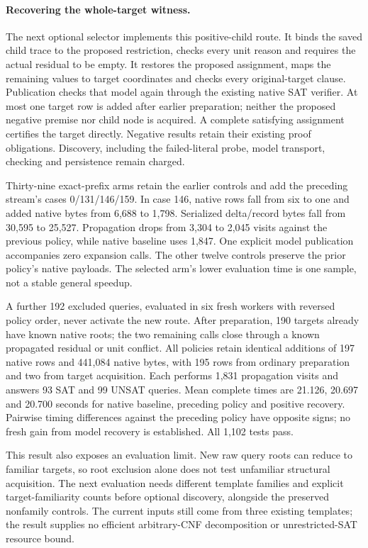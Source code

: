 \documentclass[11pt,a4paper]{article}
\numberwithin{equation}{section}
\theoremstyle{plain}
\theoremstyle{definition}
\theoremstyle{remark}
\begin{document}
\paragraph{Recovering the whole-target witness.}
The next optional selector implements this positive-child route. It binds the
saved child trace to the proposed restriction, checks every unit reason and
requires the actual residual to be empty. It restores the proposed assignment,
maps the remaining values to target coordinates and checks every original-target
clause. Publication checks that model again through the existing native SAT
verifier. At most one target row is added after earlier preparation; neither
the proposed negative premise nor child node is acquired. A complete satisfying
assignment certifies the target directly. Negative results retain their existing
proof obligations. Discovery, including the failed-literal probe, model transport,
checking and persistence remain charged.

Thirty-nine exact-prefix arms retain the earlier controls and add the preceding
stream's cases 0/131/146/159. In case 146, native rows fall from six to one and
added native bytes from 6,688 to 1,798. Serialized delta/record bytes fall from
30,595 to 25,527. Propagation drops from 3,304 to 2,045 visits against the previous
policy, while native baseline uses 1,847. One explicit model publication
accompanies zero expansion calls. The other twelve controls preserve the prior
policy's native payloads. The selected arm's lower evaluation time is one sample,
not a stable general speedup.

A further 192 excluded queries, evaluated in six fresh workers with reversed
policy order, never activate the new route. After preparation, 190 targets
already have known native roots; the two remaining calls close through a known
propagated residual or unit conflict. All policies retain identical additions
of 197 native rows and 441,084 native bytes, with 195 rows from ordinary
preparation and two from target acquisition. Each performs 1,831 propagation
visits and answers 93 SAT and 99 UNSAT queries. Mean complete times are 21.126,
20.697 and 20.700 seconds for native baseline, preceding policy and positive
recovery. Pairwise timing differences against the preceding policy have opposite
signs; no fresh gain from model recovery is established. All 1,102 tests pass.

This result also exposes an evaluation limit. New raw query roots can reduce
to familiar targets, so root exclusion alone does not test unfamiliar structural
acquisition. The next evaluation needs different template families and explicit
target-familiarity counts before optional discovery, alongside the preserved
nonfamily controls. The current inputs still come from three existing templates;
the result supplies no efficient arbitrary-CNF decomposition or unrestricted-SAT
resource bound.
\end{document}
